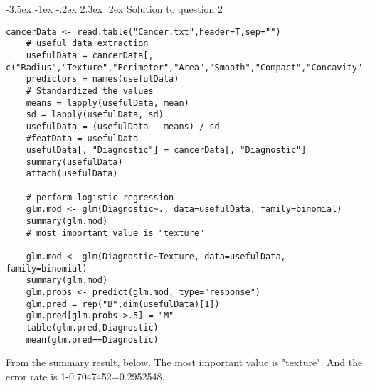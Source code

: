 \documentclass[12pt]{article}
\makeatletter
\renewcommand\section{\@startsection {section}{1}{\z@}%
	{-3.5ex \@plus -1ex \@minus -.2ex}%
	{2.3ex \@plus.2ex}%
	{\normalfont\large\bfseries}}%
\makeatother
\begin{document}
	\section{Solution to question 2}
	\lstset{language=R}
	\lstset{frame=lines}
	\lstset{basicstyle=\footnotesize\ttfamily}
	\begin{lstlisting}[breaklines=true]
	cancerData <- read.table("Cancer.txt",header=T,sep="")
	# useful data extraction
	usefulData = cancerData[, c("Radius","Texture","Perimeter","Area","Smooth","Compact","Concavity","Concave","Symmetry","Fractal")]
	predictors = names(usefulData)
	# Standardized the values
	means = lapply(usefulData, mean)
	sd = lapply(usefulData, sd)
	usefulData = (usefulData - means) / sd
	#featData = usefulData
	usefulData[, "Diagnostic"] = cancerData[, "Diagnostic"]
	summary(usefulData)
	attach(usefulData)
	
	# perform logistic regression
	glm.mod <- glm(Diagnostic~., data=usefulData, family=binomial)
	summary(glm.mod)
	# most important value is "texture"
	
	glm.mod <- glm(Diagnostic~Texture, data=usefulData, family=binomial)
	summary(glm.mod)
	glm.probs <- predict(glm.mod, type="response")
	glm.pred = rep("B",dim(usefulData)[1])
	glm.pred[glm.probs >.5] = "M"
	table(glm.pred,Diagnostic)
	mean(glm.pred==Diagnostic)
	\end{lstlisting}
	From the summary result, below. The most important value is "texture". And the error rate is 1-0.7047452=0.2952548.\\ 
	\lstset{language=R}
	\lstset{frame=lines}
	\lstset{basicstyle=\footnotesize\ttfamily}
\end{document}
